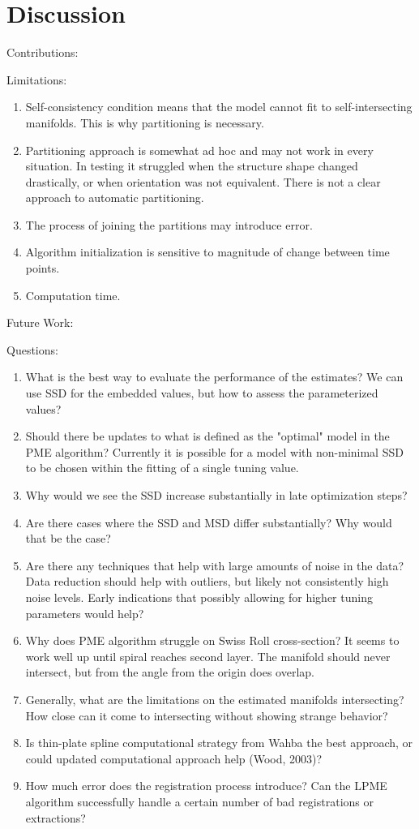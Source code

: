 \documentclass[11pt,reqno]{article}
\begin{document}
\section{Discussion}

Contributions:

Limitations:
\begin{enumerate}
  \item Self-consistency condition means that the model cannot fit to self-intersecting manifolds. This is why partitioning is necessary.
  \item Partitioning approach is somewhat ad hoc and may not work in every situation. In testing it struggled when the structure shape changed drastically, or when orientation was not equivalent. There is not a clear approach to automatic partitioning.
  \item The process of joining the partitions may introduce error.
  \item Algorithm initialization is sensitive to magnitude of change between time points.
  \item Computation time.
\end{enumerate}

Future Work:

Questions:
\begin{enumerate}
  \item What is the best way to evaluate the performance of the estimates? We can use SSD for the embedded values, but how to assess the parameterized values?
  \item Should there be updates to what is defined as the "optimal" model in the PME algorithm? Currently it is possible for a model with non-minimal SSD to be chosen within the fitting of a single tuning value.
  \item Why would we see the SSD increase substantially in late optimization steps?
  \item Are there cases where the SSD and MSD differ substantially? Why would that be the case?
  \item Are there any techniques that help with large amounts of noise in the data? Data reduction should help with outliers, but likely not consistently high noise levels. Early indications that possibly allowing for higher tuning parameters would help?
  \item Why does PME algorithm struggle on Swiss Roll cross-section? It seems to work well up until spiral reaches second layer. The manifold should never intersect, but from the angle from the origin does overlap.
  \item Generally, what are the limitations on the estimated manifolds intersecting? How close can it come to intersecting without showing strange behavior?
  \item Is thin-plate spline computational strategy from Wahba the best approach, or could updated computational approach help (Wood, 2003)?
  \item How much error does the registration process introduce? Can the LPME algorithm successfully handle a certain number of bad registrations or extractions?
\end{enumerate}

\nocite{*}
%
%
\printbibliography
\end{document}
